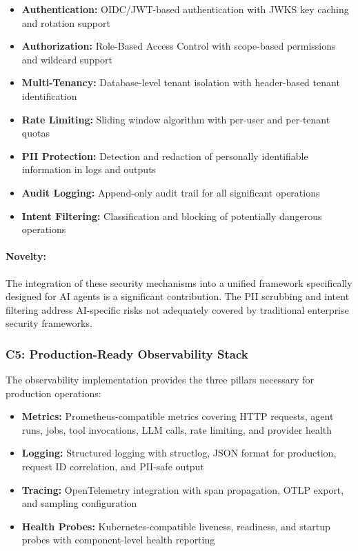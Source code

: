 \begin{itemize}
    \item \textbf{Authentication:} OIDC/JWT-based authentication with JWKS key caching and rotation support
    \item \textbf{Authorization:} Role-Based Access Control with scope-based permissions and wildcard support
    \item \textbf{Multi-Tenancy:} Database-level tenant isolation with header-based tenant identification
    \item \textbf{Rate Limiting:} Sliding window algorithm with per-user and per-tenant quotas
    \item \textbf{PII Protection:} Detection and redaction of personally identifiable information in logs and outputs
    \item \textbf{Audit Logging:} Append-only audit trail for all significant operations
    \item \textbf{Intent Filtering:} Classification and blocking of potentially dangerous operations
\end{itemize}

\paragraph{Novelty:} The integration of these security mechanisms into a unified framework specifically designed for AI agents is a significant contribution. The PII scrubbing and intent filtering address AI-specific risks not adequately covered by traditional enterprise security frameworks.

\subsubsection{C5: Production-Ready Observability Stack}

The observability implementation provides the three pillars necessary for production operations:

\begin{itemize}
    \item \textbf{Metrics:} Prometheus-compatible metrics covering HTTP requests, agent runs, jobs, tool invocations, LLM calls, rate limiting, and provider health
    \item \textbf{Logging:} Structured logging with structlog, JSON format for production, request ID correlation, and PII-safe output
    \item \textbf{Tracing:} OpenTelemetry integration with span propagation, OTLP export, and sampling configuration
    \item \textbf{Health Probes:} Kubernetes-compatible liveness, readiness, and startup probes with component-level health reporting
\end{itemize}

